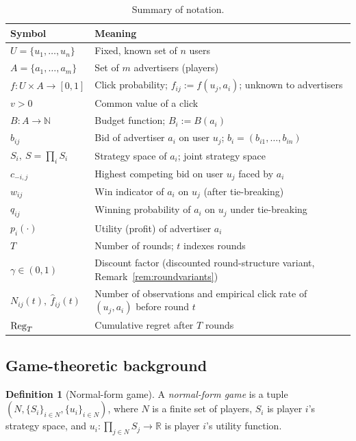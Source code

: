 \documentclass{article}
\theoremstyle{definition}
\newtheorem{definition}{Definition}
\theoremstyle{remark}
\newcommand{\N}{\mathbb{N}}
\newcommand{\R}{\mathbb{R}}
\begin{document}
\begin{table}[h]
  \caption{Summary of notation.}
  \centering
  \begin{tabularx}{\textwidth}{@{}lX@{}}
    \toprule
    Symbol & Meaning \\
    \midrule
    $U=\{u_1,\dots,u_n\}$ & Fixed, known set of $n$ users \\
    $A=\{a_1,\dots,a_m\}$ & Set of $m$ advertisers (players) \\
    $f:U\times A\to[0,1]$ & Click probability; $f_{ij}:=f(u_j,a_i)$; unknown to advertisers \\
    $v>0$ & Common value of a click \\
    $B:A\to\N$ & Budget function; $B_i:=B(a_i)$ \\
    $b_{ij}$ & Bid of advertiser $a_i$ on user $u_j$; $b_i=(b_{i1},\dots,b_{in})$ \\
    $S_i,\ S=\prod_i S_i$ & Strategy space of $a_i$; joint strategy space \\
    $c_{-i,j}$ & Highest competing bid on user $u_j$ faced by $a_i$ \\
    $w_{ij}$ & Win indicator of $a_i$ on $u_j$ (after tie-breaking) \\
    $q_{ij}$ & Winning probability of $a_i$ on $u_j$ under tie-breaking \\
    $p_i(\cdot)$ & Utility (profit) of advertiser $a_i$ \\
    $T$ & Number of rounds; $t$ indexes rounds \\
    $\gamma\in(0,1)$ & Discount factor (discounted round-structure variant, Remark~\ref{rem:roundvariants}) \\
    $N_{ij}(t),\ \hat f_{ij}(t)$ & Number of observations and empirical click rate of $(u_j,a_i)$ before round $t$ \\
    $\mathrm{Reg}_T$ & Cumulative regret after $T$ rounds \\
    \bottomrule
  \end{tabularx}
  \label{tab:notation}
\end{table}

\subsection{Game-theoretic background}

\begin{definition}[Normal-form game]
A \emph{normal-form game} is a tuple $(N,\{S_i\}_{i\in N},\{u_i\}_{i\in N})$, where $N$ is a finite set of players, $S_i$ is player $i$'s strategy space, and $u_i:\prod_{j\in N}S_j\to\R$ is player $i$'s utility function.
\end{definition}
\end{document}
